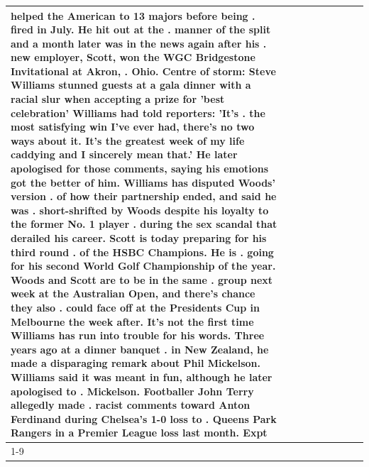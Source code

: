 \begin{table}[H]
\begin{tabular}{lllrlllll}
helped the American to 13 majors before being . fired in July. He hit out at the . manner of the split and a month later was in the news again after his . new employer, Scott, won the WGC Bridgestone Invitational at Akron, . Ohio. Centre of storm: Steve Williams stunned guests at a gala dinner with a racial slur when accepting a prize for 'best celebration' Williams had told reporters: 'It's . the most satisfying win I've ever had, there's no two ways about it. It's the greatest week of my life caddying and I sincerely mean that.' He later apologised for those comments, saying his emotions got the better of him. Williams has disputed Woods' version . of how their partnership ended, and said he was . short-shrifted by Woods despite his loyalty to the former No. 1 player . during the sex scandal that derailed his career. Scott is today preparing for his third round . of the HSBC Champions. He is . going for his second World Golf Championship of the year. Woods and Scott are to be in the same . group next week at the Australian Open, and there's chance they also . could face off at the Presidents Cup in Melbourne the week after. It's not the first time Williams has run into trouble for his words. Three years ago at a dinner banquet . in New Zealand, he made a disparaging remark about Phil Mickelson. Williams said it was meant in fun, although he later apologised to . Mickelson. Footballer John Terry allegedly made . racist comments toward Anton Ferdinand during Chelsea's 1-0 loss to . Queens Park Rangers in a Premier League loss last month. Expt \\
\cline{1-9}

\end{tabular}
\end{table}
